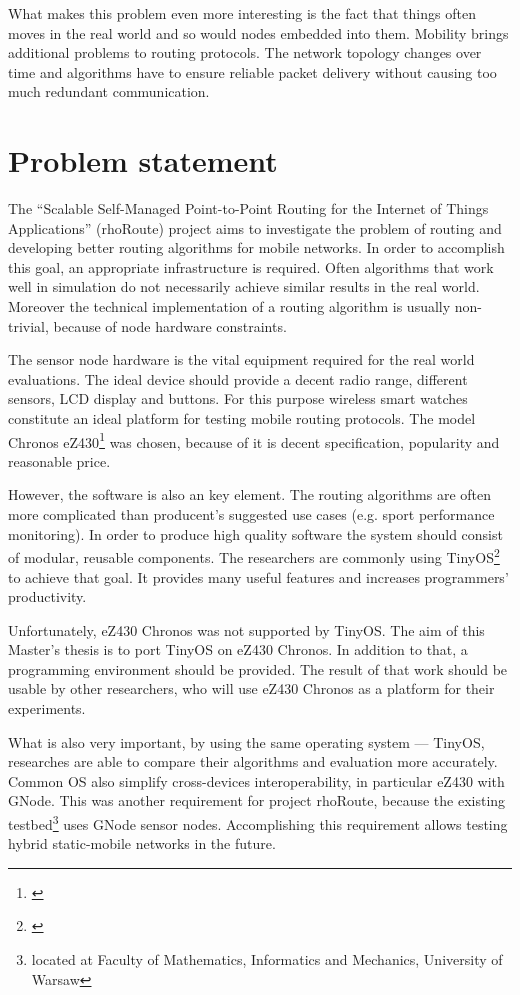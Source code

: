 What makes this problem even more interesting is the fact that things often moves in the real world and so would nodes embedded into them.
Mobility brings additional problems to routing protocols.
The network topology changes over time and algorithms have to ensure reliable packet delivery without causing too much redundant communication.


\section{Problem statement}
The ``Scalable Self-Managed Point-to-Point Routing for the Internet of Things Applications'' (rhoRoute) project aims to investigate the problem of routing and developing better routing algorithms for mobile networks.
In order to accomplish this goal, an appropriate infrastructure is required.
Often algorithms that work well in simulation do not necessarily achieve similar results in the real world.
Moreover the technical implementation of a routing algorithm is usually non-trivial, because of node hardware constraints.

The sensor node hardware is the vital equipment required for the real world evaluations.
The ideal device should provide a decent radio range, different sensors, LCD display and buttons.
For this purpose wireless smart watches constitute an ideal platform for testing mobile routing protocols.
The model Chronos eZ430\footnote{\cite{eZ430Chronos}} was chosen, because of it is decent specification, popularity and reasonable price.

However, the software is also an key element.
The routing algorithms are often more complicated than producent's suggested use cases (e.g. sport performance monitoring). 
In order to produce high quality software the system should consist of modular, reusable components.
The researchers are commonly using TinyOS\footnote{\cite{TinyOS}} to achieve that goal.
It provides many useful features and increases programmers' productivity.

Unfortunately, eZ430 Chronos was not supported by TinyOS.
The aim of this Master's thesis is to port TinyOS on eZ430 Chronos. 
In addition to that, a programming environment should be provided.
The result of that work should be usable by other researchers, who will use eZ430 Chronos as a platform for their experiments. 

What is also very important, by using the same operating system --- TinyOS, researches are able to compare their algorithms and evaluation more accurately. 
Common OS also simplify cross-devices interoperability, in particular eZ430 with GNode.
This was another requirement for project rhoRoute, because the existing testbed\footnote{located at Faculty of Mathematics, Informatics and Mechanics, University of Warsaw} uses GNode sensor nodes.
Accomplishing this requirement allows testing hybrid static-mobile networks in the future.

